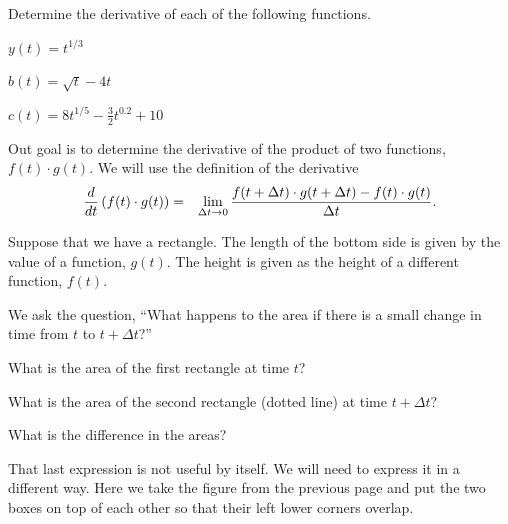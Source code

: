 \begin{problem}
\item Determine the derivative of each of the following functions.
  \begin{subproblem}
    \item $y(t)=t^{1/3}$
      \vfill
    \item $b(t)=\sqrt{t} - 4t$
      \vfill
    \item $c(t) = 8 t^{1/5} - \frac{3}{2} t^{0.2} + 10$
      \vfill
  \end{subproblem}

  \clearpage

\item Out goal is to determine the derivative of the product of two
  functions, $f(t)\cdot g(t)$. We will use the definition of the
  derivative
  \begin{eqnarray*}
    \frac{d}{dt} \left( f(t)\cdot g(t) \right) & = & 
          \lim_{\Delta t \rightarrow 0} \frac{f(t+\Delta t)\cdot g(t+\Delta t) - f(t)\cdot g(t)}{\Delta t}.
  \end{eqnarray*}

  Suppose that we have a rectangle. The length of the bottom side
  is given by the value of a function, $g(t)$. The height is given as the
  height of a different function, $f(t)$. 

  We ask the question, ``What happens to the area if there is a small
  change in time from $t$ to $t+\Delta t$?''

  \scalebox{0.55}{}

  \begin{subproblem}
  \item What is the area of the first rectangle at time $t$?
    \vfill
  \item What is the area of the second rectangle (dotted line) at time $t+\Delta t$?
    \vfill
  \item What is the difference in the areas?
    \vfill
  \end{subproblem}

  \clearpage

\item That last expression is not useful by itself. We will need to
  express it in a different way. Here we take the figure from the
  previous page and put the two boxes on top of each other so that
  their left lower corners overlap.


\end{problem}
